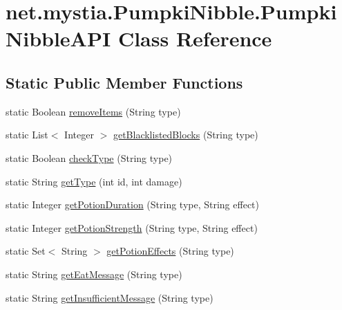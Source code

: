 \hypertarget{classnet_1_1mystia_1_1_pumpki_nibble_1_1_pumpki_nibble_a_p_i}{\section{net.\-mystia.\-Pumpki\-Nibble.\-Pumpki\-Nibble\-A\-P\-I Class Reference}
\label{classnet_1_1mystia_1_1_pumpki_nibble_1_1_pumpki_nibble_a_p_i}
}
\subsection*{Static Public Member Functions}
\begin{DoxyCompactItemize}
\item 
static Boolean \hyperlink{classnet_1_1mystia_1_1_pumpki_nibble_1_1_pumpki_nibble_a_p_i_a182550accdba5550bec1c49700c083f2}{remove\-Items} (String type)
\item 
static List$<$ Integer $>$ \hyperlink{classnet_1_1mystia_1_1_pumpki_nibble_1_1_pumpki_nibble_a_p_i_aea7dcd5d34d706bdb5f565e976cae426}{get\-Blacklisted\-Blocks} (String type)
\item 
static Boolean \hyperlink{classnet_1_1mystia_1_1_pumpki_nibble_1_1_pumpki_nibble_a_p_i_a1bb1a558a162817ad260bbba9c415d5f}{check\-Type} (String type)
\item 
static String \hyperlink{classnet_1_1mystia_1_1_pumpki_nibble_1_1_pumpki_nibble_a_p_i_a792760cd8aae250da434fd9062103d45}{get\-Type} (int id, int damage)
\item 
static Integer \hyperlink{classnet_1_1mystia_1_1_pumpki_nibble_1_1_pumpki_nibble_a_p_i_a571e07e01903c4beea1ce7d98966610d}{get\-Potion\-Duration} (String type, String effect)
\item 
static Integer \hyperlink{classnet_1_1mystia_1_1_pumpki_nibble_1_1_pumpki_nibble_a_p_i_a989d946c061a906e84122adbf802504a}{get\-Potion\-Strength} (String type, String effect)
\item 
static Set$<$ String $>$ \hyperlink{classnet_1_1mystia_1_1_pumpki_nibble_1_1_pumpki_nibble_a_p_i_a939c2c936695cea1f551d74b60f3b467}{get\-Potion\-Effects} (String type)
\item 
static String \hyperlink{classnet_1_1mystia_1_1_pumpki_nibble_1_1_pumpki_nibble_a_p_i_af74e438d93a4122c08b641c92622354f}{get\-Eat\-Message} (String type)
\item 
static String \hyperlink{classnet_1_1mystia_1_1_pumpki_nibble_1_1_pumpki_nibble_a_p_i_a4c002d80a9881faa16a0c085f05f06cd}{get\-Insufficient\-Message} (String type)

\end{DoxyCompactItemize}
